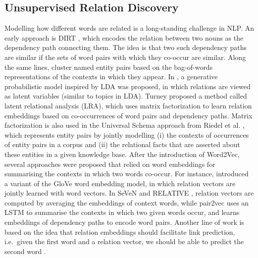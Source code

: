 \documentclass[3p]{elsarticle}
\begin{document}
{\subsection{Unsupervised Relation Discovery}
Modelling how different words are related is a long-standing challenge in NLP. An early approach is DIRT \cite{Lin2001}, which encodes the relation between two nouns as the dependency path connecting them. The idea is that two such dependency paths are similar if the sets of word pairs with which they co-occur are similar. Along the same lines, \cite{DBLP:conf/acl/HasegawaSG04} cluster named entity pairs based on the bag-of-words representations of the contexts in which they appear. In \cite{Yao2011}, a generative probabilistic model inspired by LDA \cite{DBLP:journals/jmlr/BleiNJ03} was proposed, in which relations are viewed as latent variables (similar to topics in LDA). Turney \cite{Turney:2005:MSS:1642293.1642475} proposed a method called latent relational analysis (LRA), which uses matrix factorization to learn relation embeddings based on co-occurrences of word pairs and dependency paths. Matrix factorization is also used in the Universal Schema approach from Riedel et al. \cite{Riedel2013}, which represents entity pairs by jointly modelling (i) the contexts of occurrences of entity pairs in a corpus and (ii) the relational facts that are asserted about these entities in a given knowledge base. After the introduction of Word2Vec, several approaches were proposed that relied on word embeddings for summarising the contexts in which two words co-occur. For instance, \cite{Jameel2018} introduced a variant of the GloVe word embedding model, in which relation vectors are jointly learned with word vectors. In SeVeN \cite{espinosa-anke-schockaert-2018-seven} and RELATIVE \cite{camachocollados:ijcai2019relative}, relation vectors are computed by averaging the embeddings of context words, while pair2vec \cite{joshi-etal-2019-pair2vec} uses an LSTM to summarise the contexts in which two given words occur, and \cite{Washio2018a} learns embeddings of dependency paths to encode word pairs. Another line of work is based on the idea that relation embeddings should facilitate link prediction, i.e.\ given the first word and a relation vector, we should be able to predict the second word \cite{Marcheggiani2016,DBLP:conf/acl/SimonGP19}. 



}
\end{document}

